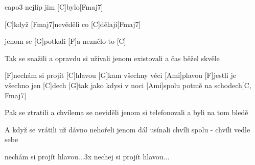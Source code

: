 \hfill capo3
nejlíp jim [C]bylo[Fmaj7]

[C]když [Fmaj7]nevěděli co [C]dělají[Fmaj7]

jenom se [G]potkali
[F]a neznělo to [C]


Tak se snažili
a opravdu si užívali
jenom existovali
a čas běžel skvěle

[F]nechám si projít [C]hlavou
[G]kam všechny věci [Ami]plavou
[F]jestli je všechno jen [C]dech
[G]tak jako kdysi v noci
[Ami]spolu potmě na schodech[C, Fmaj7]

\slpc
Pak se ztratili
a chvílema se neviděli
jenom si telefonovali
a byli na tom bledě

A když se vrátili
už dávno nehořeli
jenom dál usínali
chvíli spolu - chvíli vedle sebe

nechám si projít hlavou...3x
nechej si projít hlavou...



